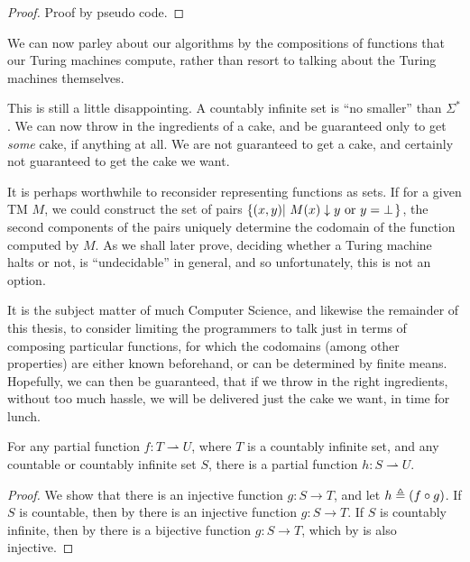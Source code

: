\begin{proof} Proof by pseudo code. \end{proof}

We can now parley about our algorithms by the compositions of functions that
our Turing machines compute, rather than resort to talking about the Turing
machines themselves.

This is still a little disappointing. A countably infinite set is ``no
smaller'' than $\Sigma^*$. We can now throw in the ingredients of a cake, and
be guaranteed only to get \emph{some} cake, if anything at all. We are not
guaranteed to get a cake, and certainly not guaranteed to get the cake we want.

It is perhaps worthwhile to reconsider representing functions as sets. If for a
given TM $M$, we could construct the set of pairs
$\mathopen{}\left\{{\mathopen{}\left({x,y}\right)\mathclose{}\mathopen{}\left|\ {\text{$M\mathopen{}\left({x}\right)\mathclose{}\downarrow y$ or $y=\bot$}}\right.\mathclose{}}\right\}\mathclose{}$, the second
components of the pairs uniquely determine the codomain of the function
computed by $M$. As we shall later prove, deciding whether a Turing machine
halts or not, is ``undecidable'' in general, and so unfortunately, this is not
an option.

It is the subject matter of much Computer Science, and likewise the remainder
of this thesis, to consider limiting the programmers to talk just in terms of
composing particular functions, for which the codomains (among other
properties) are either known beforehand, or can be determined by finite means.
Hopefully, we can then be guaranteed, that if we throw in the right
ingredients, without too much hassle, we will be delivered just the cake we
want, in time for lunch.

\begin{lemma} \label{lem:tm-domain} For any partial function $f : T
\rightharpoonup U$, where $T$ is a countably infinite set, and any countable or
countably infinite set $S$, there is a partial function $h : S \rightharpoonup
U$. \end{lemma}

\begin{proof} We show that there is an injective function $g : S \rightarrow
T$, and let $h \triangleq \mathopen{}\left({f \circ g}\right)\mathclose{}$. If $S$ is countable, then by
 there is an injective function $g : S
\rightarrow T$. If $S$ is countably infinite, then by
 there is a bijective function
$g : S \rightarrow T$, which by  is also
injective.\end{proof}

